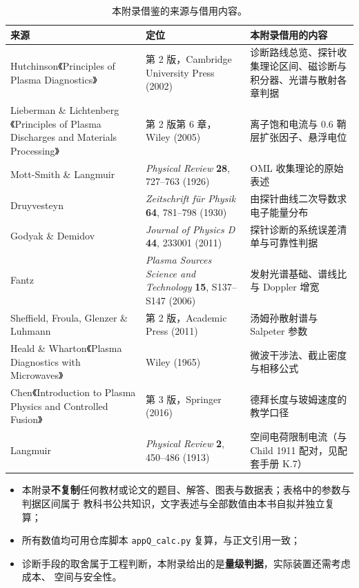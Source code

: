 \begin{table}[htbp]
  \centering
  \caption{本附录借鉴的来源与借用内容。}
  \label{tab:app-q-source}
  \begin{tabular}{@{}p{4.8cm}p{5.6cm}p{5.0cm}@{}}
    \toprule
    来源 & 定位 & 本附录借用的内容 \\
    \midrule
    Hutchinson《Principles of Plasma Diagnostics》 & 第 2 版，Cambridge University Press (2002) & 诊断路线总览、探针收集理论区间、磁诊断与积分器、光谱与散射各章判据 \\
    Lieberman \& Lichtenberg《Principles of Plasma Discharges and Materials Processing》 & 第 2 版第 6 章，Wiley (2005) & 离子饱和电流与 $0.6$ 鞘层扩张因子、悬浮电位 \\
    Mott-Smith \& Langmuir & \emph{Physical Review} \textbf{28}, 727--763 (1926) & OML 收集理论的原始表述 \\
    Druyvesteyn & \emph{Zeitschrift f\"ur Physik} \textbf{64}, 781--798 (1930) & 由探针曲线二次导数求电子能量分布 \\
    Godyak \& Demidov & \emph{Journal of Physics D} \textbf{44}, 233001 (2011) & 探针诊断的系统误差清单与可靠性判据 \\
    Fantz & \emph{Plasma Sources Science and Technology} \textbf{15}, S137--S147 (2006) & 发射光谱基础、谱线比与 Doppler 增宽 \\
    Sheffield, Froula, Glenzer \& Luhmann & 第 2 版，Academic Press (2011) & 汤姆孙散射谱与 Salpeter 参数 \\
    Heald \& Wharton《Plasma Diagnostics with Microwaves》 & Wiley (1965) & 微波干涉法、截止密度与相移公式 \\
    Chen《Introduction to Plasma Physics and Controlled Fusion》 & 第 3 版，Springer (2016) & 德拜长度与玻姆速度的教学口径 \\
    Langmuir & \emph{Physical Review} \textbf{2}, 450--486 (1913) & 空间电荷限制电流（与 Child 1911 配对，见配套手册 K.7） \\
    \bottomrule
  \end{tabular}
\end{table}

\begin{itemize}
  \item 本附录\textbf{不复制}任何教材或论文的题目、解答、图表与数据表；表格中的参数与判据区间属于
        教科书公共知识，文字表述与全部数值由本书自拟并独立复算；
  \item 所有数值均可用仓库脚本 \texttt{appQ\_calc.py} 复算，与正文引用一致；
  \item 诊断手段的取舍属于工程判断，本附录给出的是\textbf{量级判据}，实际装置还需考虑成本、
        空间与安全性。
\end{itemize}
\endgroup
